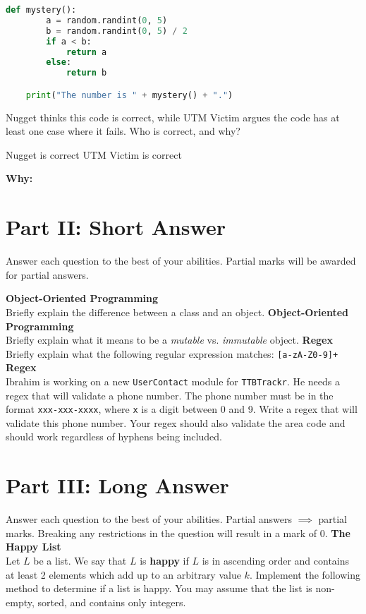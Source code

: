 \documentclass[letterpaper,12pt,addpoints]{exam}
\begin{document}
\begin{questions}
\begin{lstlisting}[language=Python, style=mystyle]
    def mystery():
        a = random.randint(0, 5)
        b = random.randint(0, 5) / 2
        if a < b:
            return a
        else:
            return b

    print("The number is " + mystery() + ".")
    \end{lstlisting}
    Nugget thinks this code is correct, while UTM Victim argues the code has at least one case where it fails. Who is correct, and why?
    \begin{choices}
        \choice Nugget is correct
        \choice UTM Victim is correct
    \end{choices}
    \textbf{Why:} \underline{\hspace{15cm}}


    \setcounter{question}{0}
    \clearpage
    \section*{Part II: Short Answer}
    Answer each question to the best of your abilities. Partial marks will be awarded for partial answers. 

    \question[5] \textbf{Object-Oriented Programming} \\
    Briefly explain the difference between a class and an object.
    \bigskip
    \bigskip
    \bigskip
    \bigskip
    \question[5] \textbf{Object-Oriented Programming} \\
    Briefly explain what it means to be a \textit{mutable} vs. \textit{immutable} object.
    \bigskip
    \bigskip
    \bigskip
    \bigskip
    \question[5] \textbf{Regex} \\
    Briefly explain what the following regular expression matches: \texttt{[a-zA-Z0-9]+} %
    \bigskip
    \bigskip
    \bigskip   
    \bigskip
    \question[5] \textbf{Regex} \\
    Ibrahim is working on a new \texttt{UserContact} module for \texttt{TTBTrackr}. He needs a regex that will validate a phone number. The phone number must be in the format \texttt{xxx-xxx-xxxx}, where \texttt{x} is a digit between 0 and 9. Write a regex that will validate this phone number. Your regex should also validate the area code and should work regardless of hyphens being included. 
    \clearpage
    \section*{Part III: Long Answer}
    \setcounter{question}{0}
    Answer each question to the best of your abilities. Partial answers $\implies$ partial marks. Breaking any restrictions in the question will result in a mark of 0.
    \question[10] \textbf{The Happy List} \\
    Let $L$ be a list. We say that $L$ is \textbf{happy} if $L$ is in ascending order and contains at least 2 elements which add up to an arbitrary value $k$. Implement the following method to determine if a list is happy. You may assume that the list is non-empty, sorted, and contains only integers.


\end{questions}
\end{document}
